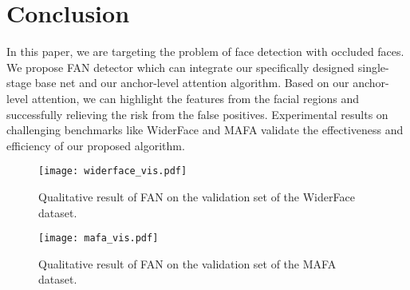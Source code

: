 \documentclass[10pt,twocolumn,letterpaper]{article}
\begin{document}
\section{Conclusion}
In this paper, we are targeting the problem of face detection with occluded faces. We propose FAN detector which can integrate our specifically designed single-stage base net and our anchor-level attention algorithm. Based on our anchor-level attention, we can highlight the features from the facial regions and successfully relieving the risk from the false positives. Experimental results on challenging benchmarks like WiderFace and MAFA validate the effectiveness and efficiency of our proposed algorithm.

\clearpage

\begin{figure*}[tp]
\begin{center}
    \texttt{[image: widerface\_vis.pdf]}
\end{center} 
    \caption{Qualitative result of FAN on the validation set of the WiderFace dataset.}
\label{fig:widerface_vis}
\end{figure*}

\begin{figure*}[bp]
\begin{center}
    \texttt{[image: mafa\_vis.pdf]}
\end{center} 
    \caption{Qualitative result of FAN on the validation set of the MAFA dataset.}
\label{fig:mafa_vis}
\end{figure*}
\clearpage

{\small


}
\end{document}
